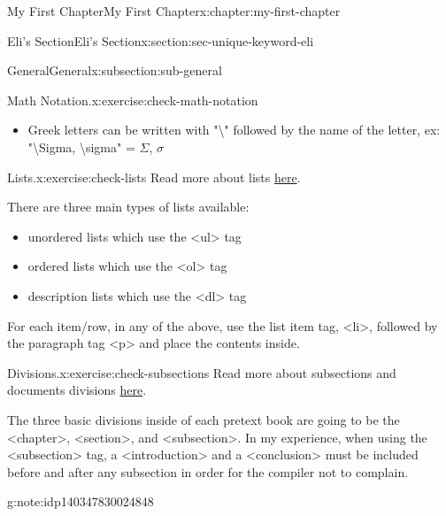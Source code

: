 \documentclass[oneside,10pt,]{book}
\numberwithin{equation}{section}
\begin{document}
\begin{chapterptx}{My First Chapter}{}{My First Chapter}{}{}{x:chapter:my-first-chapter}
\begin{sectionptx}{Eli's Section}{}{Eli's Section}{}{}{x:section:sec-unique-keyword-eli}
\begin{subsectionptx}{General}{}{General}{}{}{x:subsection:sub-general}
\begin{inlineexercise}{Math Notation.}{x:exercise:check-math-notation}
\begin{itemize}[label=\textbullet]
\begin{itemize}[label=$\circ$]
\item{}\textbackslash{}nolimits\textunderscore{}\textbraceleft{}subscript\textbraceright{}%
\end{itemize}
\begin{note}{}{g:note:idp140347824292816}%
With \textbackslash{}int, \textbackslash{}lim\textunderscore{}\textbraceleft{}n\textbackslash{}to\textbackslash{}infty\textbraceright{} or \textbackslash{}sum, if you want their sub and superscripts to appear above and below the symbol, you need to precede them with \textbackslash{}displaystyle, ex: "\textbackslash{}displaystyle\textbackslash{}lim\textunderscore{}\textbraceleft{}n\textbackslash{}to\textbackslash{}infty\textbraceright{}" = \(\displaystyle\lim_{n\to\infty}\)\end{note}
%
\item{}Greek letters can be written with "\textbackslash{}" followed by the name of the letter, ex: "\textbackslash{}Sigma, \textbackslash{}sigma" = \(\Sigma\), \(\sigma\)%
\end{itemize}
%
\end{inlineexercise}
\begin{inlineexercise}{Lists.}{x:exercise:check-lists}%
Read more about lists \href{https://pretextbook.org/doc/guide/html/topic-lists.html}{here}.%
\par
There are three main types of lists available:%
\begin{itemize}[label=\textbullet]
\item{}unordered lists which use the \textless{}ul\textgreater{} tag%
\item{}ordered lists which use the \textless{}ol\textgreater{} tag%
\item{}description lists which use the \textless{}dl\textgreater{} tag%
\end{itemize}
For each item\slash{}row, in any of the above, use the list item tag, \textless{}li\textgreater{}, followed by the paragraph tag \textless{}p\textgreater{} and place the contents inside.%
\end{inlineexercise}
\begin{inlineexercise}{Divisions.}{x:exercise:check-subsections}%
Read more about subsections and documents divisions \href{https://pretextbook.org/doc/guide/html/topic-divisions.html}{here}.%
\par
The three basic divisions inside of each pretext book are going to be the \textless{}chapter\textgreater{}, \textless{}section\textgreater{}, and \textless{}subsection\textgreater{}. In my experience, when using the \textless{}subsection\textgreater{} tag, a \textless{}introduction\textgreater{} and a \textless{}conclusion\textgreater{} must be included before and after any subsection in order for the compiler not to complain. \begin{note}{}{g:note:idp140347830024848}%

\end{note}
\end{inlineexercise}
\end{subsectionptx}
\end{sectionptx}
\end{chapterptx}
\end{document}
